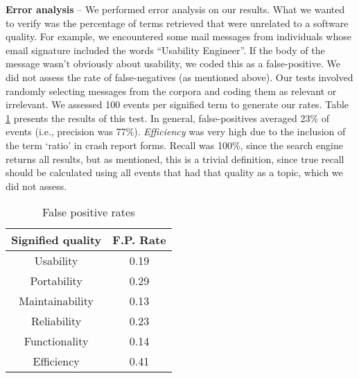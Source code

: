 \documentclass[conference, compsoc]{IEEEtran}
\begin{document}
\noindent\textbf{Error analysis} -- We performed error analysis on our results. What we wanted to verify was the percentage of terms retrieved that were unrelated to a software quality. For example, we encountered some mail messages from individuals whose email signature included the words ``Usability Engineer''. If the body of the message wasn't obviously about usability, we coded this as a false-positive. We did not assess the rate of false-negatives (as mentioned above). Our tests involved randomly selecting messages from the corpora and coding them as relevant or irrelevant. We assessed 100 events per signified term to generate our rates. Table \ref{tbl:error} presents the results of this test. In general, false-positives averaged 23\% of events (i.e., precision was 77\%). \emph{Efficiency} was very high due to the inclusion of the term `ratio' in crash report forms. Recall was 100\%, since the search engine returns all results, but as mentioned, this is a trivial definition, since true recall should be calculated using all events that had that quality as a topic, which we did not assess.

\begin{table}
	\caption{False positive rates}
	\centering
	\label{tbl:error}
\begin{tabular}{|c|c|}
\hline
\rowcolor[gray]{.9} 
Signified quality & F.P. Rate  \\ \hline
Usability & 0.19\\ \hline
Portability & 0.29\\ \hline
Maintainability & 0.13\\ \hline
Reliability & 0.23\\ \hline
Functionality & 0.14 \\ \hline
Efficiency & 0.41\\ \hline
\end{tabular}
\end{table}
\end{document}
